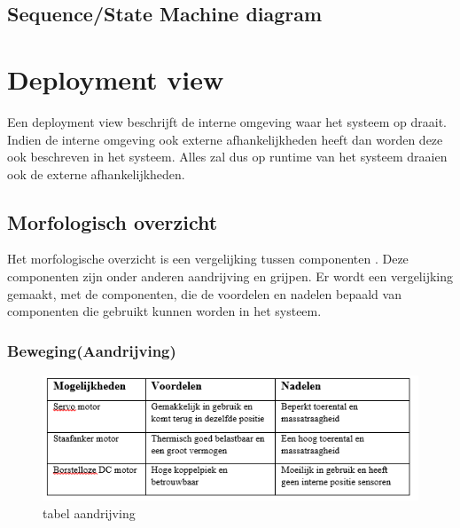 \documentclass[12pt]{article} %
\begin{document}
\subsection{Sequence/State Machine diagram}

\newpage%
\section{Deployment view}
\label{sec:Deployment view}
Een deployment view beschrijft de interne omgeving waar het systeem op draait. Indien de interne omgeving ook externe afhankelijkheden heeft dan worden deze ook beschreven in het systeem. Alles zal dus op runtime van het systeem draaien ook de externe afhankelijkheden.

\subsection{Morfologisch overzicht}
Het morfologische overzicht is een vergelijking tussen componenten . Deze componenten zijn onder anderen aandrijving en grijpen. Er wordt een vergelijking gemaakt, met de componenten, die de voordelen en nadelen bepaald van componenten die gebruikt kunnen worden in het systeem.

\subsubsection{Beweging(Aandrijving)}
\begin{center}
\begin{figure}[h]
\includegraphics[scale=1.]{tabelAand.png}
\caption{tabel aandrijving}
\label{fig:deployment}
\end{figure}
\end{center}
\clearpage
\end{document}
